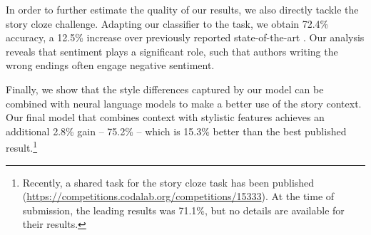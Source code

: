 \documentclass[11pt,a4paper]{article}
\newcommand{\com}[1]{}
\begin{document}

In order to further estimate the quality of our results, we 
also directly tackle the story cloze challenge. 
Adapting our classifier to the task, we obtain 72.4\% accuracy, a 12.5\% increase 
over previously reported state-of-the-art 
\cite{Salle:2016}.
Our analysis reveals that sentiment plays a significant role, such that authors writing the wrong endings often engage negative sentiment. 

Finally, we show that the style differences captured by our model can be combined with 
neural language models to make a better use of the story context. 
Our final model that combines context with stylistic features achieves 
an additional 2.8\% gain -- 75.2\% -- which is 15.3\% better than the best published result.\footnote{Recently, a shared task for the story cloze task has been published (\url{https://competitions.codalab.org/competitions/15333}). At the time of submission, the leading results was 71.1\%,
but no details are available for their results. 
}

\com{Our results suggest that writing style is affected by the the writer's state of mind.
Writing a sentence intended to be {\it wrong} turns out quite differently than a sentence intended to be {\it right}. 
Similarly, writing a sentence as part of the story is different from reading a story, and then writing the final sentence.}
\end{document}
